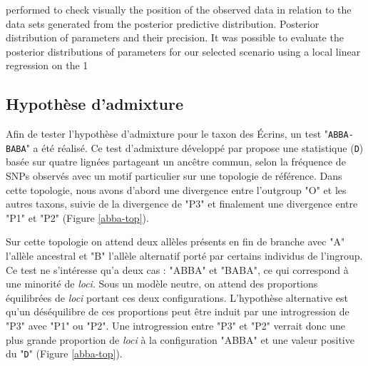 \documentclass[../Master_report2.tex]{subfiles}
\begin{document}
performed to check visually the position of the observed data in relation to the data sets generated from the posterior predictive distribution. Posterior distribution of parameters and their precision. It was possible to evaluate the posterior distributions of parameters for our selected scenario using a local linear regression on the 1%

\subsection{Hypothèse d'admixture}

Afin de tester l'hypothèse d'admixture pour le taxon des Écrins, un test "\verb|ABBA-BABA|" a été réalisé. Ce test d'admixture développé par \citet{Durand2011} propose une statistique (\verb|D|) basée sur quatre lignées partageant un ancêtre commun, selon la fréquence de SNPs observés avec un motif particulier sur une topologie de référence. 
Dans cette topologie, nous avons d'abord une divergence entre l'outgroup "O" et les autres taxons, suivie de la divergence de "P3" et finalement une divergence entre "P1" et "P2" (Figure \ref{abba-top}). 

Sur cette topologie on attend deux allèles présents en fin de branche avec "A" l'allèle ancestral et "B" l'allèle alternatif porté par certains individus de l'ingroup.
 Ce test ne s'intéresse qu'a deux cas : "ABBA" et "BABA", ce qui correspond à une minorité de \textit{loci}. Sous un modèle neutre, on attend des proportions équilibrées de \textit{loci} portant ces deux configurations. L'hypothèse alternative est qu'un déséquilibre de ces proportions peut être induit par une introgression de "P3" avec "P1" ou "P2". Une introgression entre "P3" et "P2" verrait donc une plus grande proportion de \textit{loci} à la configuration "ABBA" et une valeur positive du "\verb|D|" (Figure \ref{abba-top}).
\end{document}
